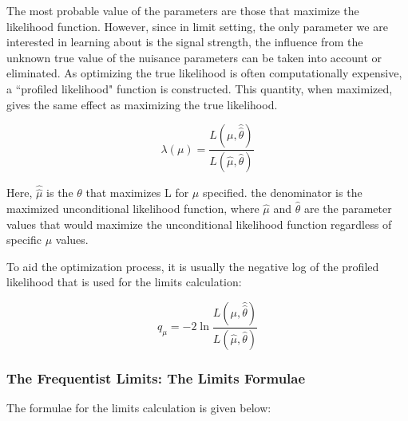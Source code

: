 The most probable value of the parameters are those that maximize the likelihood function. However, since in limit setting, the only parameter we are interested in learning about is the signal strength, the influence from the unknown true value of the nuisance parameters can be taken into account or eliminated. As optimizing the true likelihood is often computationally expensive, a ``profiled likelihood" function is constructed. This quantity, when maximized, gives the same effect as maximizing the true likelihood. 

\begin{equation}
\lambda(\mu) = \frac{L(\mu, \hat{\hat{\theta}})}{L(\hat{\mu}, \hat{\theta})}
\label{eq:profilelikelihood}
\end{equation}

Here, $\hat{\hat{\mu}}$ is the $\theta$ that maximizes L for $\mu$ specified. the denominator is the maximized unconditional likelihood function, where $\hat{\mu}$ and $\hat{\theta}$ are the parameter values that would maximize the unconditional likelihood function regardless of specific $\mu$ values.

To aid the optimization process, it is usually the negative log of the profiled likelihood that is used for the limits calculation:

\begin{equation}
    q_{\mu} = -2 \ln \frac{L(\mu, \hat{\hat{\theta}})}{L(\hat{\mu}, \hat{\theta})}
\label{teststats}
\end{equation}


\subsubsection{The Frequentist Limits: The Limits Formulae}
\label{sec:freqlimits}

The formulae for the limits calculation is given below:

